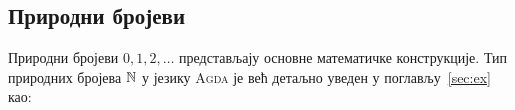 \subsection{Природни бројеви}

Природни бројеви $0, 1, 2, \ldots$ представљају основне математичке конструкције. Тип природних бројева ${\mathbb{N}}$ у језику \textsc{Agda} је већ детаљно уведен у поглављу~\ref{sec:ex} као:
\begin{code}%
\>[0]\AgdaSpace{}%
\AgdaSpace{}%
\AgdaSymbol{:}\AgdaSpace{}%
\AgdaSpace{}%
\AgdaSpace{}%
\<%
\\
\>[0][@{}l@{\AgdaIndent{0}}]%
\>[4]\AgdaSpace{}%
\AgdaSymbol{:}\AgdaSpace{}%
\<%
\\
%
\>[4]\AgdaSpace{}%
\AgdaSymbol{:}\AgdaSpace{}%
\AgdaSpace{}%
\AgdaSpace{}%
\<%
\\
\>[0]\<%
\\
\>[0]\AgdaSymbol{\{-\#}\AgdaSpace{}%
\AgdaSpace{}%
\AgdaSpace{}%
\AgdaSpace{}%
\AgdaSymbol{\#-\}}\<%
\\
%
\\[\AgdaEmptyExtraSkip]%
\>[0]%
\>[1707I]\AgdaSymbol{:}\AgdaSpace{}%
\AgdaSymbol{(}\AgdaSpace{}%
\AgdaSymbol{:}\AgdaSpace{}%
\AgdaSpace{}%
\AgdaSpace{}%
\AgdaSpace{}%
\AgdaSpace{}%
\AgdaSymbol{)}\<%
\\
\>[.][@{}l@{}]\<[1707I]%
\>[12]\AgdaSpace{}%
\AgdaSpace{}%
\<%
\\
%
\>[12]\AgdaSpace{}%
\AgdaSymbol{((}\AgdaSpace{}%
\AgdaSymbol{:}\AgdaSpace{}%
\AgdaSymbol{)}\AgdaSpace{}%
\AgdaSpace{}%
\AgdaSpace{}%
\AgdaSpace{}%
\AgdaSpace{}%
\AgdaSpace{}%
\AgdaSymbol{(}\AgdaSpace{}%
\AgdaSymbol{))}\<%
\\
%
\>[12]\AgdaSpace{}%
\AgdaSymbol{(}\AgdaSpace{}%
\AgdaSymbol{:}\AgdaSpace{}%
\AgdaSymbol{)}\AgdaSpace{}%
\AgdaSpace{}%
\AgdaSpace{}%
\<%
\\
\>[0]\AgdaSpace{}%
\AgdaSpace{}%
\AgdaSpace{}%
\AgdaSpace{}%
%
\>[29]\AgdaSymbol{=}\AgdaSpace{}%
\<%
\\
\>[0]\AgdaSpace{}%
\AgdaSpace{}%
\AgdaSpace{}%
\AgdaSpace{}%
\AgdaSymbol{(}\AgdaSpace{}%
\AgdaSymbol{)}\AgdaSpace{}%
\AgdaSymbol{=}\AgdaSpace{}%
\AgdaSpace{}%
\AgdaSpace{}%
\AgdaSymbol{(}\AgdaSpace{}%
\AgdaSpace{}%
\AgdaSpace{}%
\AgdaSpace{}%
\AgdaSymbol{)}\<%
\end{code}

